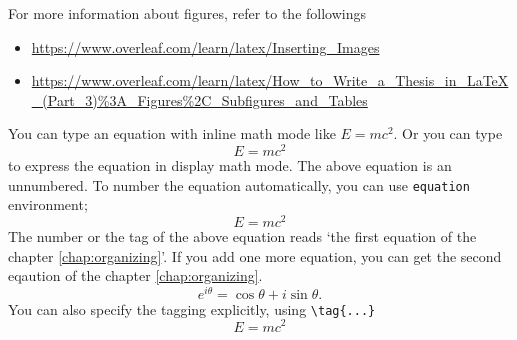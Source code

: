 \documentclass{report}
\begin{document}
For more information about figures, refer to the followings
\begin{itemize}
\item
\url{https://www.overleaf.com/learn/latex/Inserting_Images}
\item
\url{https://www.overleaf.com/learn/latex/How_to_Write_a_Thesis_in_LaTeX_(Part_3)%3A_Figures%2C_Subfigures_and_Tables}
\end{itemize}


You can type an equation with inline math mode like \(E=mc^2\). %
Or you can type
\[E=mc^2\]
to express the equation in display math mode.
The above equation is an unnumbered.
To number the equation automatically, you can use \texttt{equation} environment;
\begin{equation}
E=mc^2
\end{equation}
The number or the tag of the above equation reads `the first equation of the chapter \ref{chap:organizing}'.
If you add one more equation, you can get the second eqaution of the chapter \ref{chap:organizing}.
\begin{equation}
e^{i\theta}=\cos\theta+i\sin\theta.
\end{equation}
You can also specify the tagging explicitly, using \verb|\tag{...}|
\[E=mc^2\tag{$*$}\]
\end{document}
